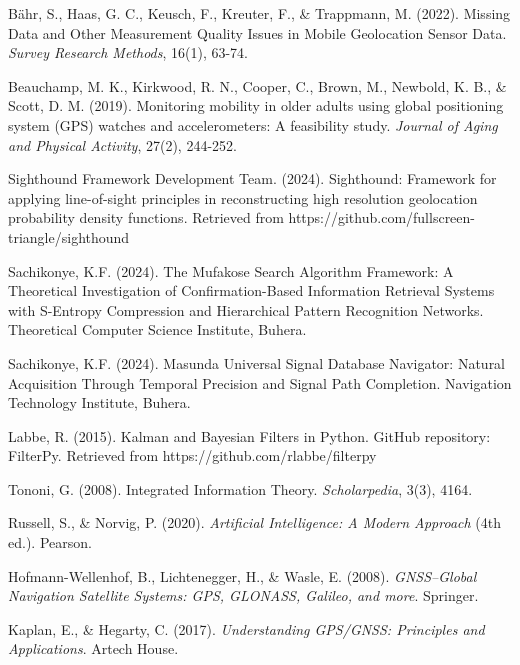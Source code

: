 \documentclass[12pt,a4paper]{article}
\begin{document}
\begin{thebibliography}{99}

Bähr, S., Haas, G. C., Keusch, F., Kreuter, F., \& Trappmann, M. (2022). Missing Data and Other Measurement Quality Issues in Mobile Geolocation Sensor Data. \textit{Survey Research Methods}, 16(1), 63-74.

Beauchamp, M. K., Kirkwood, R. N., Cooper, C., Brown, M., Newbold, K. B., \& Scott, D. M. (2019). Monitoring mobility in older adults using global positioning system (GPS) watches and accelerometers: A feasibility study. \textit{Journal of Aging and Physical Activity}, 27(2), 244-252.

Sighthound Framework Development Team. (2024). Sighthound: Framework for applying line-of-sight principles in reconstructing high resolution geolocation probability density functions. Retrieved from https://github.com/fullscreen-triangle/sighthound

Sachikonye, K.F. (2024). The Mufakose Search Algorithm Framework: A Theoretical Investigation of Confirmation-Based Information Retrieval Systems with S-Entropy Compression and Hierarchical Pattern Recognition Networks. Theoretical Computer Science Institute, Buhera.

Sachikonye, K.F. (2024). Masunda Universal Signal Database Navigator: Natural Acquisition Through Temporal Precision and Signal Path Completion. Navigation Technology Institute, Buhera.

Labbe, R. (2015). Kalman and Bayesian Filters in Python. GitHub repository: FilterPy. Retrieved from https://github.com/rlabbe/filterpy

Tononi, G. (2008). Integrated Information Theory. \textit{Scholarpedia}, 3(3), 4164.

Russell, S., \& Norvig, P. (2020). \textit{Artificial Intelligence: A Modern Approach} (4th ed.). Pearson.

Hofmann-Wellenhof, B., Lichtenegger, H., \& Wasle, E. (2008). \textit{GNSS–Global Navigation Satellite Systems: GPS, GLONASS, Galileo, and more}. Springer.

Kaplan, E., \& Hegarty, C. (2017). \textit{Understanding GPS/GNSS: Principles and Applications}. Artech House.


\end{thebibliography}
\end{document}

